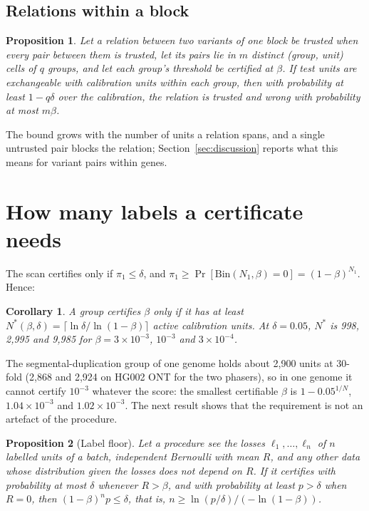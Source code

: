 \documentclass[11pt]{article}
\newcommand{\Bin}{\mathrm{Bin}}
\newtheorem{proposition}{Proposition}
\newtheorem{corollary}{Corollary}
\theoremstyle{definition}
\theoremstyle{remark}
\begin{document}
\subsection{Relations within a block}\label{sec:chains}

\begin{proposition}\label{prop:chain}
Let a relation between two variants of one block be trusted when every pair
between them is trusted, let its pairs lie in $m$ distinct (group, unit)
cells of $q$ groups, and let each group's threshold be certified at
$\beta$. If test units are exchangeable with calibration units within each
group, then with probability at least $1-q\delta$ over the calibration, the
relation is trusted and wrong with probability at most $m\beta$.
\end{proposition}

The bound grows with the number of units a relation spans, and a single
untrusted pair blocks the relation; Section~\ref{sec:discussion} reports
what this means for variant pairs within genes.

\section{How many labels a certificate needs}\label{sec:theory}

The scan certifies only if $\pi_1\le\delta$, and
$\pi_1\ge\Pr[\Bin(N_1,\beta)=0]=(1-\beta)^{N_1}$. Hence:

\begin{corollary}\label{cor:units}
A group certifies $\beta$ only if it has at least
$N^*(\beta,\delta)=\lceil\ln\delta/\ln(1-\beta)\rceil$ active calibration
units. At $\delta=0.05$, $N^*$ is 998, 2{,}995 and 9{,}985 for $\beta=3\times
10^{-3}$, $10^{-3}$ and $3\times10^{-4}$.
\end{corollary}

The segmental-duplication group of one genome holds about 2{,}900 units at
30-fold (2{,}868 and 2{,}924 on HG002 ONT for the two phasers), so in one
genome it cannot certify $10^{-3}$ whatever the score: the smallest
certifiable $\beta$ is $1-0.05^{1/N}$, $1.04\times10^{-3}$ and
$1.02\times10^{-3}$. The next result shows that the requirement is not an
artefact of the procedure.

\begin{proposition}[Label floor]\label{prop:floor}
Let a procedure see the losses $\ell_1,\dots,\ell_n$ of $n$ labelled units of
a batch, independent Bernoulli with mean $R$, and any other data whose
distribution given the losses does not depend on $R$. If it certifies with
probability at most $\delta$ whenever $R>\beta$, and with probability at
least $p>\delta$ when $R=0$, then $(1-\beta)^np\le\delta$, that is,
$n\ge\ln(p/\delta)/(-\ln(1-\beta))$.
\end{proposition}
\end{document}
